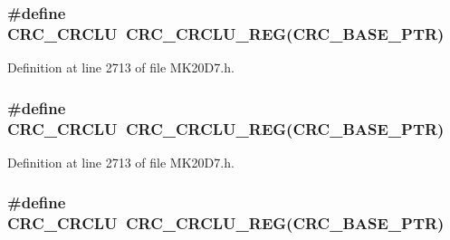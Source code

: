 \subsubsection[{\texorpdfstring{C\+R\+C\+\_\+\+C\+R\+C\+LU}{CRC_CRCLU}}]{\setlength{\rightskip}{0pt plus 5cm}\#define C\+R\+C\+\_\+\+C\+R\+C\+LU~{\bf C\+R\+C\+\_\+\+C\+R\+C\+L\+U\+\_\+\+R\+EG}({\bf C\+R\+C\+\_\+\+B\+A\+S\+E\+\_\+\+P\+TR})}\hypertarget{group___c_r_c___register___accessor___macros_ga6c4d6e445cfe03216179314829fc6c30}{}\label{group___c_r_c___register___accessor___macros_ga6c4d6e445cfe03216179314829fc6c30}


Definition at line 2713 of file M\+K20\+D7.\+h.

\subsubsection[{\texorpdfstring{C\+R\+C\+\_\+\+C\+R\+C\+LU}{CRC_CRCLU}}]{\setlength{\rightskip}{0pt plus 5cm}\#define C\+R\+C\+\_\+\+C\+R\+C\+LU~{\bf C\+R\+C\+\_\+\+C\+R\+C\+L\+U\+\_\+\+R\+EG}({\bf C\+R\+C\+\_\+\+B\+A\+S\+E\+\_\+\+P\+TR})}\hypertarget{group___c_r_c___register___accessor___macros_ga6c4d6e445cfe03216179314829fc6c30}{}\label{group___c_r_c___register___accessor___macros_ga6c4d6e445cfe03216179314829fc6c30}


Definition at line 2713 of file M\+K20\+D7.\+h.

\subsubsection[{\texorpdfstring{C\+R\+C\+\_\+\+C\+R\+C\+LU}{CRC_CRCLU}}]{\setlength{\rightskip}{0pt plus 5cm}\#define C\+R\+C\+\_\+\+C\+R\+C\+LU~{\bf C\+R\+C\+\_\+\+C\+R\+C\+L\+U\+\_\+\+R\+EG}({\bf C\+R\+C\+\_\+\+B\+A\+S\+E\+\_\+\+P\+TR})}\hypertarget{group___c_r_c___register___accessor___macros_ga6c4d6e445cfe03216179314829fc6c30}{}\label{group___c_r_c___register___accessor___macros_ga6c4d6e445cfe03216179314829fc6c30}


